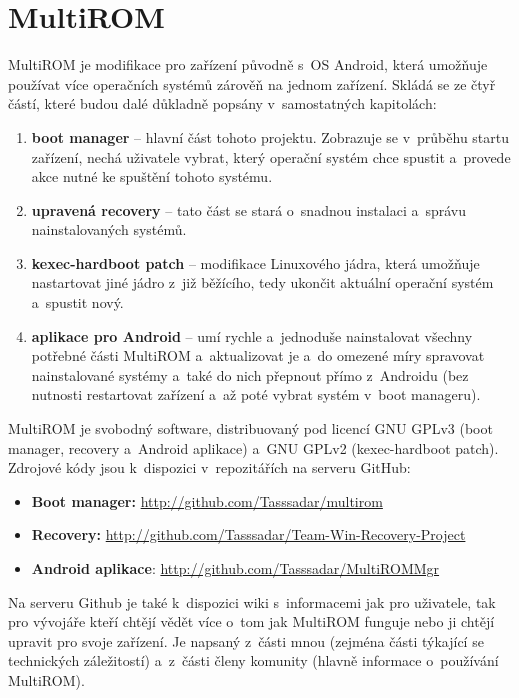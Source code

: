 \documentclass[12pt, a4paper, oneside]{article}
\newcommand{\B}{\textbf} %
\begin{document}
\section{MultiROM}
MultiROM je modifikace pro zařízení původně s~OS Android, která umožňuje používat více operačních systémů zárověň na jednom zařízení. Skládá se ze čtyř částí, které budou dalé důkladně popsány v~samostatných kapitolách:

\begin{enumerate}
    \item \B{boot manager} -- hlavní část tohoto projektu. Zobrazuje se v~průběhu startu zařízení, nechá uživatele vybrat, který operační systém chce spustit a~provede akce nutné ke spuštění tohoto systému.
    \item \B{upravená recovery} -- tato část se stará o~snadnou instalaci a~správu nainstalovaných systémů.
    \item \B{kexec-hardboot patch} -- modifikace Linuxového jádra, která umožňuje nastartovat jiné jádro z~již běžícího, tedy ukončit aktuální operační systém a~spustit nový.
    \item \B{aplikace pro Android} -- umí rychle a~jednoduše nainstalovat všechny potřebné části MultiROM a~aktualizovat je a~do omezené míry spravovat nainstalované systémy a~také do nich přepnout přímo z~Androidu (bez nutnosti restartovat zařízení a~až poté vybrat systém v~boot manageru).
\end{enumerate}

MultiROM je svobodný software, distribuovaný pod licencí GNU GPLv3 (boot manager, recovery a~Android aplikace) a~GNU GPLv2 (kexec-hardboot patch). Zdrojové kódy jsou k~dispozici v~repozitářích na serveru GitHub:
\begin{itemize}
    \item \B{Boot manager:} \url{http://github.com/Tasssadar/multirom}
    \item \B{Recovery:} \url{http://github.com/Tasssadar/Team-Win-Recovery-Project}
    \item \B{Android aplikace}: \url{http://github.com/Tasssadar/MultiROMMgr}
\end{itemize}

Na serveru Github je také k~dispozici wiki s~informacemi jak pro uživatele, tak pro vývojáře kteří chtějí vědět více o~tom jak MultiROM funguje nebo ji chtějí upravit pro svoje zařízení. Je napsaný z~části mnou (zejména části týkající se technických záležitostí) a~z~části členy komunity (hlavně informace o~používání MultiROM).
\end{document}
